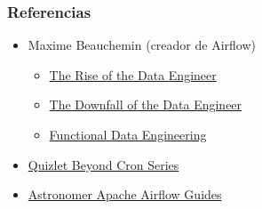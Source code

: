 \documentclass[leqno, 10pt, envcountsect]{beamer}
\numberwithin{equation}{section}
\theoremstyle{definition}
\theoremstyle{example}
\numberwithin{figure}{section}
\numberwithin{table}{section}
\let\olditem\item
\renewcommand{\item}{%
\olditem\vspace{1pt}}
\begin{document}
\begin{frame}[fragile=singleslide]
  \frametitle{Referencias}
  \begin{itemize}
    \item Maxime Beauchemin (creador de Airflow)
      \begin{itemize}
        \item \href{https://www.freecodecamp.org/news/the-rise-of-the-data-engineer-91be18f1e603/}{The Rise of the Data Engineer}
        \item \href{https://medium.com/@maximebeauchemin/the-downfall-of-the-data-engineer-5bfb701e5d6b}{The Downfall of the Data Engineer}
        \item \href{https://medium.com/@maximebeauchemin/functional-data-engineering-a-modern-paradigm-for-batch-data-processing-2327ec32c42a}{Functional Data Engineering}
      \end{itemize}
    \item \href{https://medium.com/@dustinstansbury/beyond-cron-an-introduction-to-workflow-management-systems-19987afcdb5e}{Quizlet Beyond Cron Series}
    \item \href{https://www.astronomer.io/guides/}{Astronomer Apache Airflow Guides}
  \end{itemize}
\end{frame}
\end{document}
